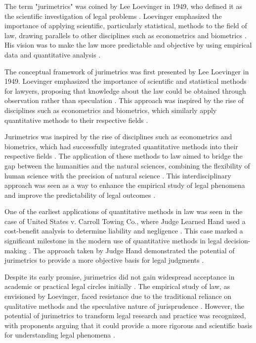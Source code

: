 The term "jurimetrics" was coined by Lee Loevinger in 1949, who defined it as the scientific investigation of legal problems \cite{l2010de, zabala2019d}. Loevinger emphasized the importance of applying scientific, particularly statistical, methods to the field of law, drawing parallels to other disciplines such as econometrics and biometrics \cite{ribeiro2021quantification, l2010de}. His vision was to make the law more predictable and objective by using empirical data and quantitative analysis \cite{1023071190721, l2010de}.

The conceptual framework of jurimetrics was first presented by Lee Loevinger in 1949. Loevinger emphasized the importance of scientific and statistical methods for lawyers, proposing that knowledge about the law could be obtained through observation rather than speculation \cite{l2010de}. This approach was inspired by the rise of disciplines such as econometrics and biometrics, which similarly apply quantitative methods to their respective fields \cite{ribeiro2021quantification}.

Jurimetrics was inspired by the rise of disciplines such as econometrics and biometrics, which had successfully integrated quantitative methods into their respective fields \cite{ribeiro2021quantification, zabala2019d}. The application of these methods to law aimed to bridge the gap between the humanities and the natural sciences, combining the flexibility of human science with the precision of natural science \cite{zabala2019d}. This interdisciplinary approach was seen as a way to enhance the empirical study of legal phenomena and improve the predictability of legal outcomes \cite{1023071190721, l2010de}.

One of the earliest applications of quantitative methods in law was seen in the case of United States v. Carroll Towing Co., where Judge Learned Hand used a cost-benefit analysis to determine liability and negligence \cite{zabala2019d}. This case marked a significant milestone in the modern use of quantitative methods in legal decision-making \cite{zabala2019d}. The approach taken by Judge Hand demonstrated the potential of jurimetrics to provide a more objective basis for legal judgments \cite{zabala2019d}.

Despite its early promise, jurimetrics did not gain widespread acceptance in academic or practical legal circles initially \cite{l2010de}. The empirical study of law, as envisioned by Loevinger, faced resistance due to the traditional reliance on qualitative methods and the speculative nature of jurisprudence \cite{1023071190721, l2010de}. However, the potential of jurimetrics to transform legal research and practice was recognized, with proponents arguing that it could provide a more rigorous and scientific basis for understanding legal phenomena \cite{l2010de, 1023071190721}.


